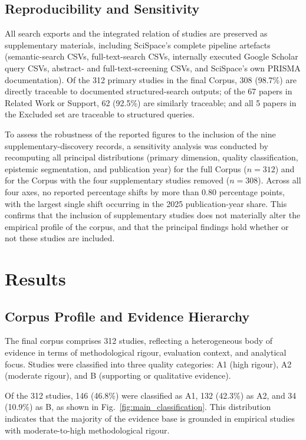 \subsection{Reproducibility and Sensitivity}
\label{sec:reproducibility}
All search exports and the integrated relation of studies are preserved as supplementary materials, including SciSpace's complete pipeline artefacts (semantic-search CSVs, full-text-search CSVs, internally executed Google Scholar query CSVs, abstract- and full-text-screening CSVs, and SciSpace's own PRISMA documentation). Of the 312 primary studies in the final Corpus, 308 (98.7\%) are directly traceable to documented structured-search outputs; of the 67 papers in Related Work or Support, 62 (92.5\%) are similarly traceable; and all 5 papers in the Excluded set are traceable to structured queries.

To assess the robustness of the reported figures to the inclusion of the nine supplementary-discovery records, a sensitivity analysis was conducted by recomputing all principal distributions (primary dimension, quality classification, epistemic segmentation, and publication year) for the full Corpus ($n = 312$) and for the Corpus with the four supplementary studies removed ($n = 308$). Across all four axes, no reported percentage shifts by more than 0.80 percentage points, with the largest single shift occurring in the 2025 publication-year share. This confirms that the inclusion of supplementary studies does not materially alter the empirical profile of the corpus, and that the principal findings hold whether or not these studies are included.

\section{Results}
\label{sec:results}
\subsection{Corpus Profile and Evidence Hierarchy}
\label{sec:corpus-profile}
The final corpus comprises 312 studies, reflecting a heterogeneous body of evidence in terms of methodological rigour, evaluation context, and analytical focus. Studies were classified into three quality categories: A1 (high rigour), A2 (moderate rigour), and B (supporting or qualitative evidence).

Of the 312 studies, 146 (46.8\%) were classified as A1, 132 (42.3\%) as A2, and 34 (10.9\%) as B, as shown in Fig.~\ref{fig:main_classification}. This distribution indicates that the majority of the evidence base is grounded in empirical studies with moderate-to-high methodological rigour.

